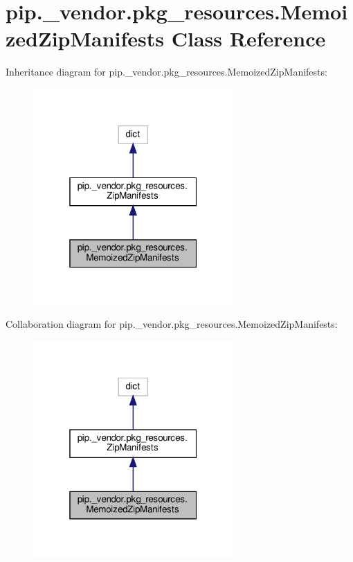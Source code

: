 \hypertarget{classpip_1_1__vendor_1_1pkg__resources_1_1MemoizedZipManifests}{}\section{pip.\+\_\+vendor.\+pkg\+\_\+resources.\+Memoized\+Zip\+Manifests Class Reference}
\label{classpip_1_1__vendor_1_1pkg__resources_1_1MemoizedZipManifests}


Inheritance diagram for pip.\+\_\+vendor.\+pkg\+\_\+resources.\+Memoized\+Zip\+Manifests\+:
\nopagebreak
\begin{figure}[H]
\begin{center}
\leavevmode
\includegraphics[width=217pt]{classpip_1_1__vendor_1_1pkg__resources_1_1MemoizedZipManifests__inherit__graph}
\end{center}
\end{figure}


Collaboration diagram for pip.\+\_\+vendor.\+pkg\+\_\+resources.\+Memoized\+Zip\+Manifests\+:
\nopagebreak
\begin{figure}[H]
\begin{center}
\leavevmode
\includegraphics[width=217pt]{classpip_1_1__vendor_1_1pkg__resources_1_1MemoizedZipManifests__coll__graph}
\end{center}
\end{figure}
